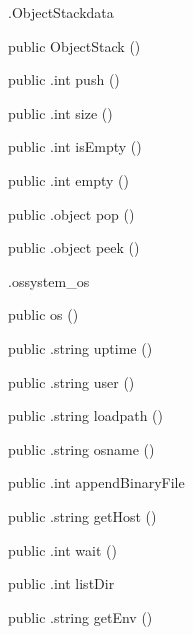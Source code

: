 \begin{CrexxClass}{.ObjectStack}{data}

  \begin{Hierarchy}
  \end{Hierarchy}

  \begin{Members}

    \Factory
      {public}
      {ObjectStack}
      {()}

    \Method
      {public}
      {.int}
      {push}
      {()}

    \Method
      {public}
      {.int}
      {size}
      {()}

    \Method
      {public}
      {.int}
      {isEmpty}
      {()}

    \Method
      {public}
      {.int}
      {empty}
      {()}

    \Method
      {public}
      {.object}
      {pop}
      {()}

    \Method
      {public}
      {.object}
      {peek}
      {()}

  \end{Members}
\end{CrexxClass}

\begin{CrexxClass}{.os}{system\_os}

  \begin{Hierarchy}
  \end{Hierarchy}

  \begin{Members}

    \Factory
      {public}
      {os}
      {()}

    \Method
      {public}
      {.string}
      {uptime}
      {()}

    \Method
      {public}
      {.string}
      {user}
      {()}

    \Method
      {public}
      {.string}
      {loadpath}
      {()}

    \Method
      {public}
      {.string}
      {osname}
      {()}

    \Method
      {public}
      {.int}
      {appendBinaryFile}
      {}

    \Method
      {public}
      {.string}
      {getHost}
      {()}

    \Method
      {public}
      {.int}
      {wait}
      {()}

    \Method
      {public}
      {.int}
      {listDir}
      {}

    \Method
      {public}
      {.string}
      {getEnv}
      {()}

  \end{Members}
\end{CrexxClass}

